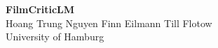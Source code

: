 \begin{titlepage}
\centering
\vspace*{2cm}

{\LARGE\bfseries FilmCriticLM}\\[1.5cm]

Hoang Trung Nguyen \quad Finn Eilmann \quad Till Flotow\\[0.3cm]
{\small University of Hamburg}\\[1.5cm]

\begin{abstract}
\noindent
We build on the transformer architecture \cite{attention} 
and use rotary position embeddings \cite{rope}.
\end{abstract}

\vfill
\end{titlepage}
